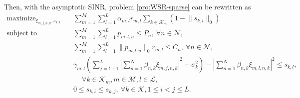 \documentclass[12pt, draftclsnofoot, onecolumn]{IEEEtran}
\newtheorem{theorem}{Theorem}
\begin{document}
Then, with the asymptotic SINR, problem \eqref{pro:WSR-sparse} can be rewritten as
\begin{subequations}
\begin{align} 
\mathop{\text{maximize}}_{\xi_{m,j,n,k}, s_{k,l}} \quad & \sum_{m=1}^M \sum_{l=1}^L \alpha_{m,l}  r_{m,l} \sum_{k \in \mathcal{K}_m} (1- \lVert s_{k,l} \lVert_0 ) \label{obj:asym-WSR-sparse} \\ 
\text{subject to} \quad & \sum_{m=1}^M \sum_{l=1}^L p_{m,l,n} \leq P_n,~\forall n \in \mathcal{N}, \label{cons:asym-WSR-sparse-power}\\
& \sum_{m=1}^M \sum_{l=1}^L \lVert p_{m,l,n} \rVert_0 r_{m,l} \leq C_n,~\forall n \in \mathcal{N}, \label{cons:asym-WSR-sparse-backhaul} \\
& \gamma_{m,l} \left (\sum_{j = l+1}^L \left \lvert \sum_{n = 1}^N \beta_{n,k} \xi_{m,j,n,k} \right \rvert^2 + \sigma_k^2 \right) - \left \lvert \sum_{n = 1}^N \beta_{n,k} \xi_{m,l,n,k} \right \rvert^2 \leq s_{k,l}, \nonumber\\
&\quad~\forall k \in \mathcal{K}_{m}, m \in \mathcal{M}, l \in \mathcal{L}, \label{cons:asym-WSR-sparse-SINR} \\
& 0 \leq s_{k,i} \leq s_{k,j},~\forall k \in \mathcal{K}, 1 \leq i < j \leq L. \label{cons:asym-WSR-sparse-order} 
\end{align} \label{pro:asym-WSR-sparse}
\end{subequations}



\end{document}
